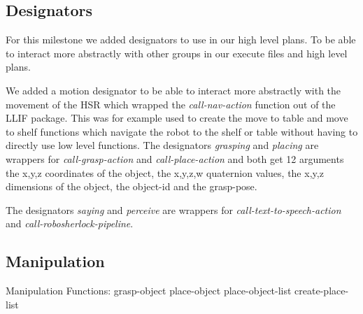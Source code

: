 \documentclass[main.tex]{subfiles}
\begin{document}
	                \subsection{Designators}
		                For this milestone we added designators to use in our high level plans. To be able to interact more abstractly with other groups in our execute files and high level plans.
                
		                We added a motion designator to be able to interact more abstractly with the movement of the HSR which wrapped the \textit{call-nav-action} function out of the LLIF package. This was for example used to create the move to table and move to shelf functions which navigate the robot to the shelf or table without having to directly use low level functions.
		                The designators \textit {grasping} and \textit {placing} are wrappers for \textit {call-grasp-action} and \textit {call-place-action} and both get 12 arguments the x,y,z coordinates of the object, the x,y,z,w quaternion values, the x,y,z dimensions of the object, the object-id and the grasp-pose. 
                
		                The designators \textit {saying} and \textit {perceive} are wrappers for \textit {call-text-to-speech-action} and \textit {call-robosherlock-pipeline}. 
                
	                \subsection{Manipulation}
		                Manipulation Functions:
		                grasp-object
		                place-object
		                place-object-list
		                create-place-list
                
                
                
\end{document}
